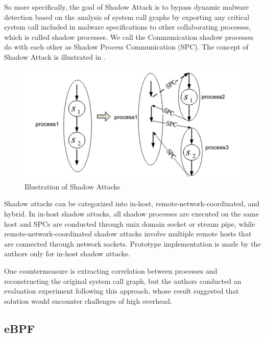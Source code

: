 So more specifically, the goal of Shadow Attack is to bypass dynamic malware detection based on
the analysis of system call graphs by exporting any critical system call included in malware specifications to
other collaborating processes, which is called shadow processes.
We call the Communication shadow processes do with each other as Shadow Process Communication (SPC).
The concept of Shadow Attack is illustrated in .
\begin{figure}[tp]
  \begin{center}
    \includegraphics[width=\columnwidth]{./img/archi_SA.png}
  \end{center}
  \caption{Illustration of Shadow Attacks
    \cite{Weiqin:ShadowAttack}}
  \label{img:shadow-attack}
\end{figure}

Shadow attacks can be categorized into in-host, remote-network-coordinated, and hybrid.
In in-host shadow attacks, all shadow processes are executed on the same host and SPCs are conducted through
unix domain socket or stream pipe, while remote-network-coordinated shadow attacks involve multiple remote hosts
that are connected through network sockets.
Prototype implementation is made by the authors only for in-host shadow attacks.

One countermeasure is extracting correlation between processes and reconstructing
the original system call graph, but the authors conducted an evaluation experiment following this approach,
whose result suggested that solution would encounter challenges of high overhead.

\subsection{eBPF}

